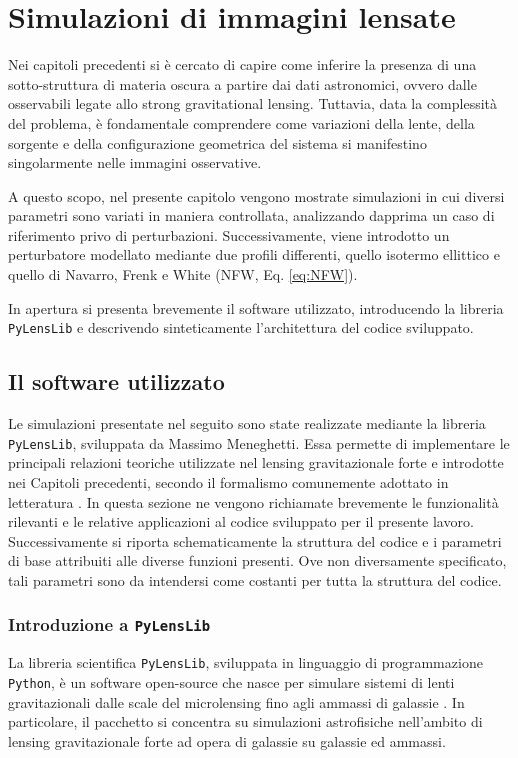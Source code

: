 \chapter{Simulazioni di immagini lensate}
\label{cap:simulazioni}
Nei capitoli precedenti si è cercato di capire come inferire la presenza di una sotto-struttura di materia oscura a partire dai dati astronomici, ovvero dalle osservabili legate allo strong gravitational lensing. Tuttavia, data la complessità del problema, è fondamentale comprendere come variazioni della lente, della sorgente e della configurazione geometrica del sistema si manifestino singolarmente nelle immagini osservative.

A questo scopo, nel presente capitolo vengono mostrate simulazioni in cui diversi parametri sono variati in maniera controllata, analizzando dapprima un caso di riferimento privo di perturbazioni. Successivamente, viene introdotto un perturbatore modellato mediante due profili differenti, quello isotermo ellittico e quello di Navarro, Frenk e White (NFW, Eq. \ref{eq:NFW}).

In apertura si presenta brevemente il software utilizzato, introducendo la libreria \texttt{PyLensLib} e descrivendo sinteticamente l'architettura del codice sviluppato.

\section{Il software utilizzato}
Le simulazioni presentate nel seguito sono state realizzate mediante la libreria \texttt{PyLensLib}, sviluppata da Massimo Meneghetti. Essa permette di implementare le principali relazioni teoriche utilizzate nel lensing gravitazionale forte e introdotte nei Capitoli precedenti, secondo il formalismo comunemente adottato in letteratura \parencite{Meneghetti2022}. In questa sezione ne vengono richiamate brevemente le funzionalità rilevanti e le relative applicazioni al codice sviluppato per il presente lavoro. Successivamente si riporta schematicamente la struttura del codice e i parametri di base attribuiti alle diverse funzioni presenti. Ove non diversamente specificato, tali parametri sono da intendersi come costanti per tutta la struttura del codice.
\newpage

\subsection{Introduzione a \texttt{PyLensLib}}
La libreria scientifica \texttt{PyLensLib}, sviluppata in linguaggio di programmazione \texttt{Python}, è un software open-source che nasce per simulare sistemi di lenti gravitazionali dalle scale del microlensing fino agli ammassi di galassie \parencite{PyLensLib}. In particolare, il pacchetto si concentra su simulazioni astrofisiche nell'ambito di lensing gravitazionale forte ad opera di galassie su galassie ed ammassi.

